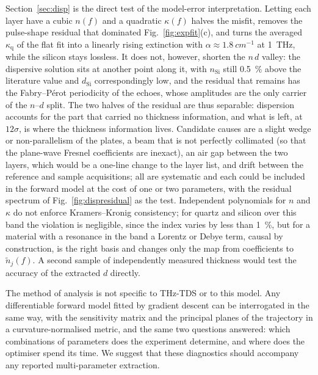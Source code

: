 \documentclass{optica-article}
\newcommand{\kap}{\kappa}
\begin{document}
Section~\ref{sec:disp} is the direct test of the model-error interpretation. Letting each layer have a cubic $n(f)$ and a quadratic $\kap(f)$ halves the misfit, removes the pulse-shape residual that dominated Fig.~\ref{fig:expfit}(c), and turns the averaged $\kap_{\mathrm{q}}$ of the flat fit into a linearly rising extinction with $\alpha\approx\SI{1.8}{cm^{-1}}$ at \SI{1}{THz}, while the silicon stays lossless. It does not, however, shorten the $n\,d$ valley: the dispersive solution sits at another point along it, with $n_{\mathrm{Si}}$ still \SI{0.5}{\percent} above the literature value and $d_{\mathrm{Si}}$ correspondingly low, and the residual that remains has the Fabry--P\'erot periodicity of the echoes, whose amplitudes are the only carrier of the $n$--$d$ split. The two halves of the residual are thus separable: dispersion accounts for the part that carried no thickness information, and what is left, at $12\sigma$, is where the thickness information lives. Candidate causes are a slight wedge or non-parallelism of the plates, a beam that is not perfectly collimated (so that the plane-wave Fresnel coefficients are inexact), an air gap between the two layers, which would be a one-line change to the layer list, and drift between the reference and sample acquisitions; all are systematic and each could be included in the forward model at the cost of one or two parameters, with the residual spectrum of Fig.~\ref{fig:dispresidual} as the test. Independent polynomials for $n$ and $\kap$ do not enforce Kramers--Kronig consistency; for quartz and silicon over this band the violation is negligible, since the index varies by less than \SI{1}{\percent}, but for a material with a resonance in the band a Lorentz or Debye term, causal by construction, is the right basis and changes only the map from coefficients to $\tilde n_j(f)$. A second sample of independently measured thickness would test the accuracy of the extracted $d$ directly. 

The method of analysis is not specific to THz-TDS or to this model. Any differentiable forward model fitted by gradient descent \cite{Baydin2018} can be interrogated in the same way, with the sensitivity matrix and the principal planes of the trajectory in a curvature-normalised metric, and the same two questions answered: which combinations of parameters does the experiment determine, and where does the optimiser spend its time. We suggest that these diagnostics should accompany any reported multi-parameter extraction.
\end{document}

